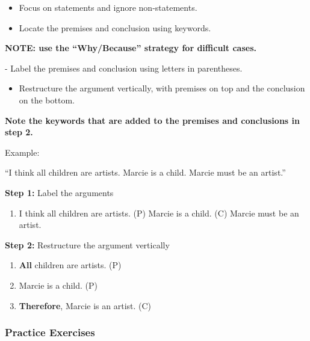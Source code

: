 \documentclass[
]{book}
\providecommand{\tightlist}{%
  \setlength{\itemsep}{0pt}\setlength{\parskip}{0pt}}
\begin{document}
\begin{itemize}
\item
  Focus on statements and ignore non-statements.
\item
  Locate the premises and conclusion using keywords.
\end{itemize}

\begin{progress}
\textbf{NOTE: use the ``Why/Because'' strategy for difficult cases.}
\end{progress}
- Label the premises and conclusion using letters in parentheses.

\begin{itemize}
\tightlist
\item
  Restructure the argument vertically, with premises on top and the conclusion on the bottom.
\end{itemize}

\begin{progress}
\textbf{Note the keywords that are added to the premises and conclusions in step 2.}
\end{progress}

Example:

``I think all children are artists. Marcie is a child. Marcie must be an artist.''

\textbf{Step 1:} Label the arguments

\begin{enumerate}
\def\labelenumi{(\Alph{enumi})}
\setcounter{enumi}{15}
\tightlist
\item
  I think all children are artists. (P) Marcie is a child. (C) Marcie must be an artist.
\end{enumerate}

\textbf{Step 2:} Restructure the argument vertically

\begin{enumerate}
\def\labelenumi{\arabic{enumi}.}
\tightlist
\item
  \textbf{All} children are artists. (P)
\item
  Marcie is a child. (P)
\item
  \textbf{Therefore}, Marcie is an artist. (C)
\end{enumerate}

\hypertarget{practice-exercises-1}{%
\subsubsection*{Practice Exercises}\label{practice-exercises-1}}
\end{document}
